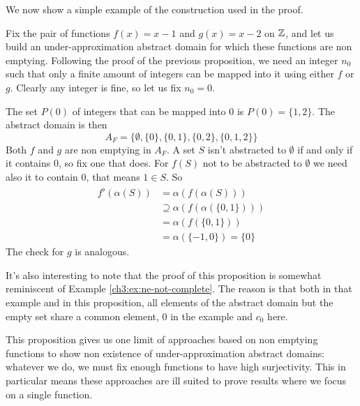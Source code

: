 We now show a simple example of the construction used in the proof.
\begin{example}
	Fix the pair of functions $f(x) = x - 1$ and $g(x) = x - 2$ on $\mathbb{Z}$, and let us build an under-approximation abstract domain for which these functions are non emptying. Following the proof of the previous proposition, we need an integer $n_0$ such that only a finite amount of integers can be mapped into it using either $f$ or $g$. Clearly any integer is fine, so let us fix $n_0 = 0$.

	The set $P(0)$ of integers that can be mapped into $0$ is $P(0) = \{ 1, 2 \}$. The abstract domain is then
	\[
	A_F = \{ \emptyset, \{ 0 \}, \{ 0, 1 \}, \{ 0, 2 \}, \{ 0, 1, 2 \} \}
	\]
	Both $f$ and $g$ are non emptying in $A_F$. A set $S$ isn't abstracted to $\emptyset$ if and only if it contains $0$, so fix one that does.
	For $f(S)$ not to be abstracted to $\emptyset$ we need also it to contain $0$, that means $1 \in S$. So
	\begin{align*}
		f^{\flat}(\alpha(S)) &= \alpha(f(\alpha(S))) \\
		&\supseteq \alpha(f(\alpha(\{ 0, 1 \}))) \\
		&= \alpha(f(\{ 0, 1 \})) \\
		&= \alpha(\{ -1, 0 \}) = \{ 0 \}
	\end{align*}
	The check for $g$ is analogous.
\end{example}
It's also interesting to note that the proof of this proposition is somewhat reminiscent of Example \ref{ch3:ex:ne-not-complete}. The reason is that both in that example and in this proposition, all elements of the abstract domain but the empty set share a common element, $0$ in the example and $c_0$ here.

This proposition gives us one limit of approaches based on non emptying functions to show non existence of under-approximation abstract domains: whatever we do, we must fix enough functions to have high surjectivity. This in particular means these approaches are ill suited to prove results where we focus on a single function.


